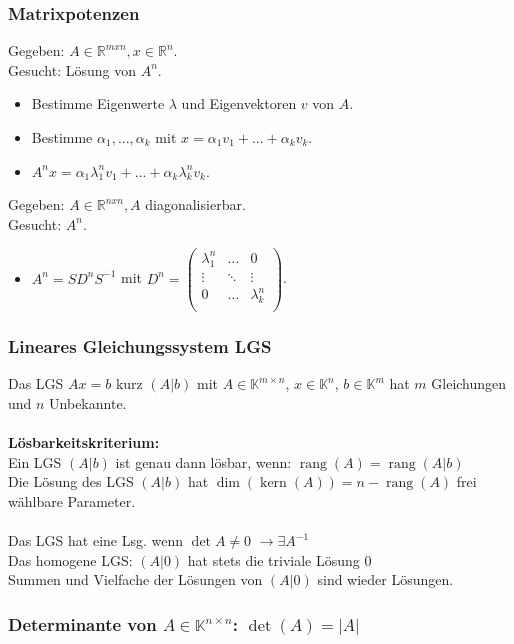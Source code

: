 \documentclass[6pt,a4paper]{scrartcl}
\DeclareMathOperator{\rang}{rang}
\DeclareMathOperator{\Kern}{kern}
\begin{document}
\begin{multicols*}{4}
\subsubsection{Matrixpotenzen}
Gegeben: $A \in\mathbb{R}^{mxn}, x \in\mathbb{R}^n$.\\
Gesucht: Lösung von $A^n$.\\
\begin{itemize}
	\item Bestimme Eigenwerte $\lambda$ und Eigenvektoren $v$ von $A$.
	\item Bestimme $\alpha_1, ..., \alpha_k$ mit $x = \alpha_1v_1 + ... + \alpha_kv_k$.
	\item $A^nx = \alpha_1\lambda_1^nv_1+ ... + \alpha_k\lambda_k^nv_k$.
\end{itemize}
Gegeben: $A \in\mathbb{R}^{nxn}, A$ diagonalisierbar.\\
Gesucht: $A^n$.
\begin{itemize}
	\item $A^n = SD^nS^{-1}$ mit $D^n = \begin{pmatrix}
	\lambda_1^n & \ldots & 0 \\
	\vdots & \ddots & \vdots\\
	0 & \ldots & \lambda_k^n \\
	\end{pmatrix}$.
\end{itemize}

\subsubsection{Lineares Gleichungssystem LGS}
Das LGS $Ax=b$ kurz $(A|b)$ mit $A\in \mathbb K^{m\times n}$, $x\in \mathbb K^n$, $b\in \mathbb K^m$ hat $m$ Gleichungen und $n$ Unbekannte.\\
\\
\textbf{Lösbarkeitskriterium:}\\
Ein LGS $(A|b)$ ist genau dann lösbar, wenn: $\rang(A)=\rang(A|b)$\\
Die Lösung des LGS $(A|b)$ hat $\dim(\Kern(A)) = n-\rang(A)$ frei wählbare Parameter.\\
\\
Das LGS hat eine Lsg. wenn $\det A \not= 0$ \quad $\rightarrow \exists A^{-1}$ \\
Das homogene LGS: $(A|0)$ hat stets die triviale Lösung $0$\\
Summen und Vielfache der Lösungen von $(A|0)$ sind wieder Lösungen.

\subsubsection{Determinante von $A\in \mathbb K^{n\times n}$: $\det(A)=|A|$}


\end{multicols*}
\end{document}
